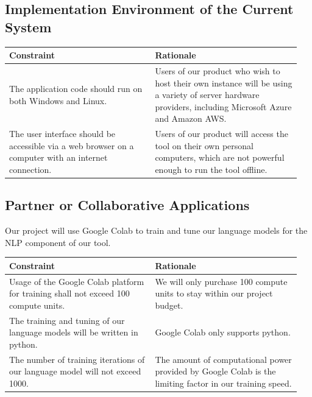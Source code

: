 \documentclass[12pt]{article}
\begin{document}
\subsection{Implementation Environment of the Current System}
\begin{table}[h!]
    \centering
    \begin{tabular}{| p{0.475\linewidth} | p{0.475\linewidth} |}
    \hline
    \textbf{Constraint}   & \textbf{Rationale} \\
    \hline
    The application code should run on both Windows and Linux. &
    Users of our product who wish to host their own instance will be using a variety of server hardware providers, including Microsoft Azure and Amazon AWS. \\
    \hline
    The user interface should be accessible via a web browser on a computer with an internet connection. &
    Users of our product will access the tool on their own personal computers, which are not powerful enough to run the tool offline. \\
    \hline
    \end{tabular}
\end{table}



\subsection{Partner or Collaborative Applications}
Our project will use Google Colab to train and tune our language models for the NLP component of our tool.
\begin{table}[h!]
    \centering
    \begin{tabular}{| p{0.475\linewidth} | p{0.475\linewidth} |}
    \hline
    \textbf{Constraint}   & \textbf{Rationale} \\
    \hline
    Usage of the Google Colab platform for training shall not exceed 100 compute units. &
    We will only purchase 100 compute units to stay within our project budget. \\
    \hline
    The training and tuning of our language models will be written in python. &
    Google Colab only supports python. \\
    \hline
    The number of training iterations of our language model will not exceed 1000. &
    The amount of computational power provided by Google Colab is the limiting factor in our training speed. \\
    \hline
    \end{tabular}
\end{table}
\end{document}
